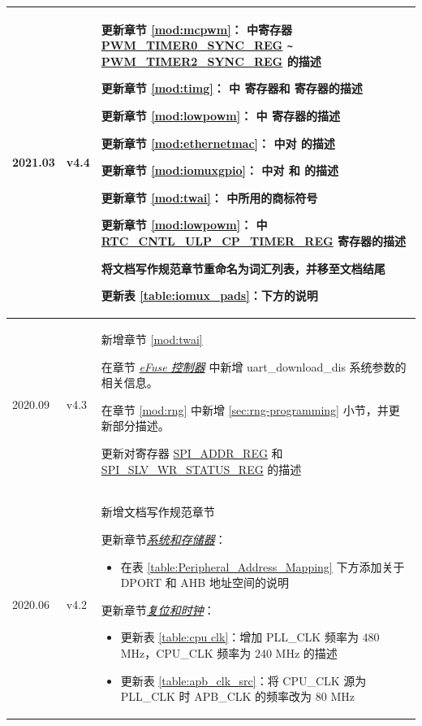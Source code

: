 \begin{longtable}[l]{ | m{2cm} | m{1.5cm} | m{12cm} | }
2021.03 & v4.4 &
更新章节 \ref{mod:mcpwm}：\textit{\nameref{mod:mcpwm}} 中寄存器 \hyperref[regdesc:PWMTIMER0SYNCREG]{PWM\_TIMER0\_SYNC\_REG} \verb+~+ \hyperref[regdesc:PWMTIMER2SYNCREG]{PWM\_TIMER2\_SYNC\_REG} 的描述

更新章节 \ref{mod:timg}：\textit{\nameref{mod:timg}} 中 \nameref{regdesc:TIMGRTCCALICFGREG} 寄存器和 \nameref{regdesc:TIMGRTCCALICFG1REG} 寄存器的描述

更新章节 \ref{mod:lowpowm}：\textit{\nameref{mod:lowpowm}} 中 \nameref{regdesc:RTCCNTLWDTCONFIG0REG} 寄存器的描述

更新章节 \ref{mod:ethernetmac}：\textit{\nameref{mod:ethernetmac}} 中对 \nameref{fielddesc:MIICSRCLK} 的描述

更新章节 \ref{mod:iomuxgpio}：\textit{\nameref{mod:iomuxgpio}} 中对 \nameref{regdesc:FUNWPU} 和 \nameref{regdesc:FUNWPD} 的描述

更新章节 \ref{mod:twai}：\textit{\nameref{mod:twai}} 中所用的商标符号

更新章节 \ref{mod:lowpowm}：\textit{\nameref{mod:lowpowm}} 中 \hyperlink{regdesc:RTCCNTLULPCPTIMERREG}{RTC\_CNTL\_ULP\_CP\_TIMER\_REG} 寄存器的描述

将文档写作规范章节重命名为词汇列表，并移至文档结尾

更新表 \ref{table:iomux_pads}：\textit{\nameref{table:iomux_pads}}下方的说明
\\\hline
2020.09 & v4.3 &
新增章节 \ref{mod:twai} \textit{\nameref{mod:twai}}

在章节 \hyperref[mod:efuse]{\it{eFuse 控制器}} 中新增 uart\_download\_dis 系统参数的相关信息。

在章节 \ref{mod:rng} \textit{\nameref{mod:rng}} 中新增 \ref{sec:rng-programming} \textit{\nameref{sec:rng-programming}} 小节，并更新部分描述。

更新对寄存器 \hyperref[regdesc:SPIADDRREG]{SPI\_ADDR\_REG} 和 \hyperref[regdesc:SPISLVWRSTATUSREG]{SPI\_SLV\_WR\_STATUS\_REG} 的描述
\\\hline
2020.06 & v4.2 &
新增文档写作规范章节

更新章节\hyperref[mod:sysmem]{\it{系统和存储器}}：
\begin{itemize}
\item 在表 \ref{table:Peripheral_Address_Mapping} 下方添加关于 DPORT 和 AHB 地址空间的说明
\end{itemize}

更新章节\hyperref[mod:resclk]{\it{复位和时钟}}：
\begin{itemize}
\item 更新表 \ref{table:cpu clk}：增加 PLL\_CLK 频率为 480 MHz，CPU\_CLK 频率为 240 MHz 的描述
\item 更新表 \ref{table:apb_clk_src}：将 CPU\_CLK 源为 PLL\_CLK 时 APB\_CLK 的频率改为 80 MHz
\end{itemize}


\end{longtable}
